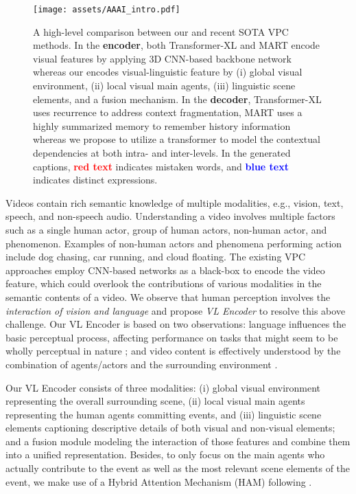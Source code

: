 \documentclass[letterpaper]{article} \usepackage{aaai23}  \usepackage{times}  \usepackage{helvet}  \usepackage{courier}  \usepackage[hyphens]{url}  \usepackage{graphicx} \urlstyle{rm} \def\UrlFont{\rm}  \usepackage{natbib}  \usepackage{caption} \frenchspacing  \setlength{\pdfpagewidth}{8.5in}  \setlength{\pdfpageheight}{11in}  \usepackage{algorithm}
\newcommand{\encoder}{VL Encoder\xspace}
\begin{document}
\begin{figure}[!thb]
    \centering
    \texttt{[image: assets/AAAI\_intro.pdf]}
    \caption{A high-level comparison between our \model and recent SOTA VPC methods. In the \textbf{encoder}, both Transformer-XL \cite{dai2019transformer} and MART \cite{lei2020mart} encode visual features by applying 3D CNN-based backbone network whereas our \model encodes visual-linguistic feature by (i) global visual environment, (ii) local visual main agents, (iii) linguistic scene elements, and a fusion mechanism. In the \textbf{decoder}, Transformer-XL uses recurrence to address context fragmentation, MART uses a highly summarized memory to remember history information whereas we propose to utilize a transformer to model the contextual dependencies at both intra- and inter-levels. In the generated captions, \textbf{\textcolor{red}{red text}} indicates mistaken words, and \textbf{\textcolor{blue}{blue text}} indicates distinct expressions.}
    \label{fig:compare_model}
    \vspace{-2mm}
\end{figure}


 
Videos contain rich semantic knowledge of multiple modalities, e.g., vision, text, speech, and non-speech audio. Understanding a video involves multiple factors such as a single human actor, group of human actors, non-human actor, and phenomenon. Examples of non-human actors and phenomena performing action include dog chasing, car running, and cloud floating. 
The existing VPC approaches \cite{zhou2018end, dai2019transformer, lei2020mart} employ CNN-based networks as a black-box to encode the video feature, which could overlook the contributions of various modalities in the semantic contents of a video.
We observe that human perception involves the \emph{interaction of vision and language} and propose \emph{VL Encoder} to resolve this above challenge. Our \encoder is based on two observations: language influences the basic perceptual process, affecting performance on tasks that might seem to be wholly perceptual in nature \cite{Lupyan2020}; and video content is effectively understood by the combination of agents/actors and the surrounding environment \cite{KhoaVo_ICASSP, KhoaVo_Access, vo2021aei}. 

Our \encoder consists of three modalities: (i) global visual environment representing the overall surrounding scene, (ii) local visual main agents representing the human agents committing events, and (iii) linguistic scene elements captioning descriptive details of both visual and non-visual elements; and a fusion module modeling the interaction of those features and combine them into a unified representation. Besides, to only focus on the main agents who actually contribute to the event as well as the most relevant scene elements of the event, we make use of a Hybrid Attention Mechanism (HAM) following \cite{vo2021aei}.
\end{document}
